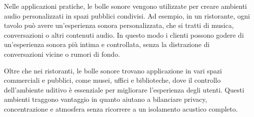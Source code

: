 Nelle applicazioni pratiche, le bolle sonore vengono utilizzate per creare ambienti audio personalizzati in spazi pubblici condivisi. Ad esempio, in un ristorante, ogni tavolo può avere un'esperienza sonora personalizzata, che si tratti di musica, conversazioni o altri contenuti audio. In questo modo i clienti possono godere di un'esperienza sonora più intima e controllata, senza la distrazione di conversazioni vicine o rumori di fondo. 

Oltre che nei ristoranti, le bolle sonore trovano applicazione in vari spazi commerciali e pubblici, come musei, uffici e biblioteche, dove il controllo dell'ambiente uditivo è essenziale per migliorare l'esperienza degli utenti. Questi ambienti traggono vantaggio in quanto aiutano a bilanciare privacy, concentrazione e atmosfera senza ricorrere a un isolamento acustico completo. \cite{cit-multiaudio}

